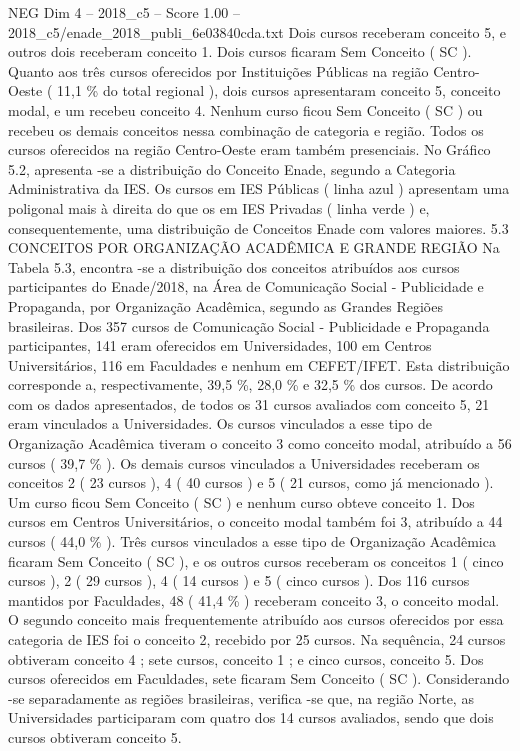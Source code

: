 \begin{textsample}{NEG Dim 4 – 2018\_c5 – Score 1.00 – 2018\_c5/enade\_2018\_publi\_6e03840cda.txt}
Dois cursos receberam conceito 5, e outros dois receberam conceito 1.
Dois cursos ficaram Sem Conceito ( SC ).
Quanto aos três cursos oferecidos por Instituições Públicas na região Centro-Oeste ( 11,1 \% do total regional ), dois cursos apresentaram conceito 5, conceito modal, e um recebeu conceito 4.
Nenhum curso ficou Sem Conceito ( SC ) ou recebeu os demais conceitos nessa combinação de categoria e região.
Todos os cursos oferecidos na região Centro-Oeste eram também presenciais.
No Gráfico 5.2, apresenta -se a distribuição do Conceito Enade, segundo a Categoria Administrativa da IES.
Os cursos em IES Públicas ( linha azul ) apresentam uma poligonal mais à direita do que os em IES Privadas ( linha verde ) e, consequentemente, uma distribuição de Conceitos Enade com valores maiores. 5.3 CONCEITOS POR ORGANIZAÇÃO ACADÊMICA E GRANDE REGIÃO Na Tabela 5.3, encontra -se a distribuição dos conceitos atribuídos aos cursos participantes do Enade/2018, na Área de Comunicação Social - Publicidade e Propaganda, por Organização Acadêmica, segundo as Grandes Regiões brasileiras.
Dos 357 cursos de Comunicação Social - Publicidade e Propaganda participantes, 141 eram oferecidos em Universidades, 100 em Centros Universitários, 116 em Faculdades e nenhum em CEFET/IFET.
Esta distribuição corresponde a, respectivamente, 39,5 \%, 28,0 \% e 32,5 \% dos cursos.
De acordo com os dados apresentados, de todos os 31 cursos avaliados com conceito 5, 21 eram vinculados a Universidades.
Os cursos vinculados a esse tipo de Organização Acadêmica tiveram o conceito 3 como conceito modal, atribuído a 56 cursos ( 39,7 \% ).
Os demais cursos vinculados a Universidades receberam os conceitos 2 ( 23 cursos ), 4 ( 40 cursos ) e 5 ( 21 cursos, como já mencionado ).
Um curso ficou Sem Conceito ( SC ) e nenhum curso obteve conceito 1.
Dos cursos em Centros Universitários, o conceito modal também foi 3, atribuído a 44 cursos ( 44,0 \% ).
Três cursos vinculados a esse tipo de Organização Acadêmica ficaram Sem Conceito ( SC ), e os outros cursos receberam os conceitos 1 ( cinco cursos ), 2 ( 29 cursos ), 4 ( 14 cursos ) e 5 ( cinco cursos ).
Dos 116 cursos mantidos por Faculdades, 48 ( 41,4 \% ) receberam conceito 3, o conceito modal.
O segundo conceito mais frequentemente atribuído aos cursos oferecidos por essa categoria de IES foi o conceito 2, recebido por 25 cursos.
Na sequência, 24 cursos obtiveram conceito 4 ; sete cursos, conceito 1 ; e cinco cursos, conceito 5.
Dos cursos oferecidos em Faculdades, sete ficaram Sem Conceito ( SC ).
Considerando -se separadamente as regiões brasileiras, verifica -se que, na região Norte, as Universidades participaram com quatro dos 14 cursos avaliados, sendo que dois cursos obtiveram conceito 5.

\end{textsample}

